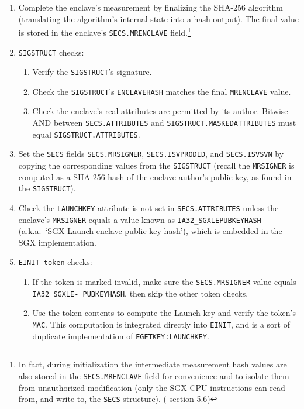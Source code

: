 \begin{enumerate}
    \item Complete the enclave's measurement by finalizing the SHA-256 algorithm (translating the algorithm's internal state into a hash output). The final value is stored in the enclave's {\tt SECS.MRENCLAVE} field.\footnote{In fact, during initialization the intermediate measurement hash values are also stored in the {\tt SECS.MRENCLAVE} field for convenience and to isolate them from unauthorized modification (only the SGX CPU instructions can read from, and write to, the {\tt SECS} structure). (\cite{intel-sgx-explained-advanced} section 5.6)}

    \item {\tt SIGSTRUCT} checks:
    \begin{enumerate}
        \item Verify the {\tt SIGSTRUCT}'s signature.

        \item Check the {\tt SIGSTRUCT}'s {\tt ENCLAVEHASH} matches the final {\tt MRENCLAVE} value.

        \item Check the enclave's real attributes are permitted by its author. Bitwise AND between {\tt SECS.ATTRIBUTES} and {\tt SIGSTRUCT.MASKEDATTRIBUTES} must equal {\tt SIGSTRUCT.ATTRIBUTES}.
    \end{enumerate}
    
    \item Set the {\tt SECS} fields {\tt SECS.MRSIGNER}, {\tt SECS.ISVPRODID}, and {\tt SECS.ISVSVN} by copying the corresponding values from the {\tt SIGSTRUCT} (recall the {\tt MRSIGNER} is computed as a SHA-256 hash of the enclave author's public key, as found in the {\tt SIGSTRUCT}).

    \item Check the {\tt LAUNCHKEY} attribute is not set in {\tt SECS.ATTRIBUTES} unless the enclave's {\tt MRSIGNER} equals a value known as {\tt IA32\_SGXLEPUBKEYHASH} (a.k.a.\ `SGX Launch enclave public key hash'), which is embedded in the SGX implementation.

    \item {\tt EINIT token} checks:
    \begin{enumerate}
        \item If the token is marked invalid, make sure the {\tt SECS.MRSIGNER} value equals {\tt IA32\_SGXLE- PUBKEYHASH}, then skip the other token checks.

        \item Use the token contents to compute the Launch key and verify the token's {\tt MAC}. This computation is integrated directly into {\tt EINIT}, and is a sort of duplicate implementation of {\tt EGETKEY:LAUNCHKEY}.


\end{enumerate}
\end{enumerate}
